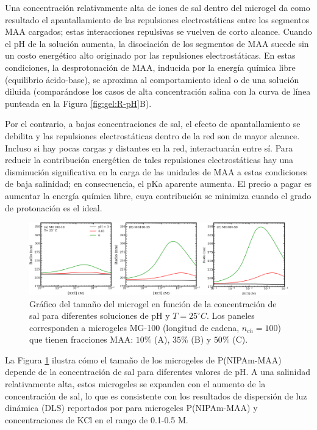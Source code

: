 Una concentraci\'on relativamente alta de iones de sal dentro del microgel da como resultado el apantallamiento de las repulsiones electrost\'aticas entre los segmentos MAA cargados; estas interacciones repulsivas se vuelven de corto alcance.
Cuando el pH de la soluci\'on aumenta, la disociaci\'on de los segmentos de MAA sucede sin un costo energ\'etico alto originado por las repulsiones electrost\'aticas.
En estas condiciones, la desprotonaci\'on de MAA, inducida por la energ\'ia qu\'imica libre (equilibrio \'acido-base), se aproxima al comportamiento ideal o de una soluci\'on diluida (compar\'andose los casos de alta concentraci\'on salina con la curva de l\'inea punteada en la Figura \ref{fig:gel:R-pH}B).

Por el contrario, a bajas concentraciones de sal, el efecto de apantallamiento se debilita y las repulsiones electrost\'aticas dentro de la red son de mayor alcance.
Incluso si hay pocas cargas y distantes en la red, interactuar\'an entre s\'i.
Para reducir la contribuci\'on energ\'etica de tales repulsiones electrost\'aticas hay una disminuci\'on significativa en la carga de las unidades de MAA a estas condiciones de baja salinidad;
en consecuencia, el pKa aparente aumenta.
El precio a pagar es aumentar la energ\'ia qu\'imica libre, cuya contribuci\'on se minimiza cuando el grado de protonaci\'on es el ideal.




\begin{figure}[!htb]
	\centering
	\includegraphics[width=0.99\linewidth]{Figures/graph-gel/R-cs.pdf}
	\caption{Gr\'afico del tama\~no del microgel en funci\'on de la concentraci\'on de sal para diferentes soluciones de pH y $T=25 ^\circ C$.
		Los paneles corresponden a microgeles MG-100 (longitud de cadena, $n_{ch}=100$) que tienen fracciones MAA: $10\%$ (A), $35\%$ (B) y $50\%$ (C).}
	\label{fig:gel:R-cs}
\end{figure}


La Figura \ref{fig:gel:R-cs} ilustra c\'omo el tama\~no de los microgeles de P(NIPAm-MAA) depende de la concentraci\'on de sal para diferentes valores de pH.
A una salinidad relativamente alta, estos microgeles se expanden con el aumento de la concentraci\'on de sal, lo que es consistente con los resultados de dispersi\'on de luz din\'amica (DLS) reportados por \citet{Wong2009} para microgeles P(NIPAm-MAA) y concentraciones de KCl en el rango de 0.1-0.5 M.

